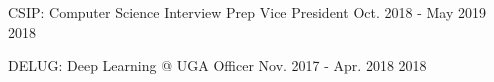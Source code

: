 \begin{cvhonors}

\cvhonor
{CSIP: Computer Science Interview Prep}
{Vice President}
{Oct. 2018 - May 2019}
{2018}

\cvhonor
{DELUG: Deep Learning @ UGA}
{Officer}
{Nov. 2017 - Apr. 2018}
{2018}

\end{cvhonors}
